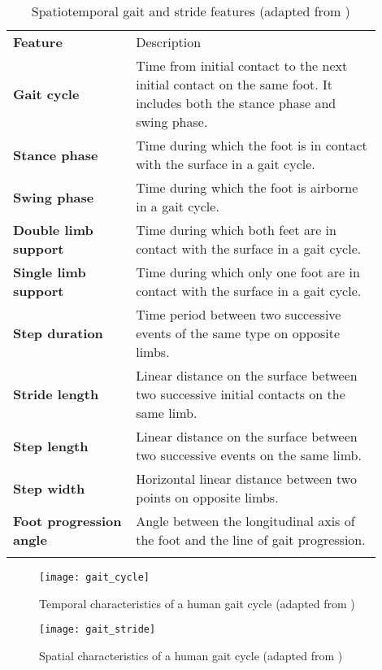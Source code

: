 		\begin{longtable}{@{}>{\raggedright\arraybackslash\bfseries}m{0.3\linewidth}>{\raggedright\arraybackslash}m{0.6\linewidth}@{}}
		\toprule
		Feature & Description \\* \midrule 
		\endhead
		Gait cycle & Time from initial contact to the next initial contact on the same foot. It includes both the stance phase and swing phase.  \\
		Stance phase & Time during which the foot is in contact with the surface in a gait cycle. \\
		Swing phase & Time during which the foot is airborne in a gait cycle. \\
		Double limb support & Time during which both feet are in contact with the surface in a gait cycle. \\
		Single limb support & Time during which only one foot are in contact with the surface in a gait cycle. \\
		Step duration & Time period between two successive events of the same type on opposite limbs. \\
		Stride length & Linear distance on the surface between two successive initial contacts on the same limb. \\
		Step length & Linear distance on the surface between two successive events on the same limb. \\
		Step width & Horizontal linear distance between two points on opposite limbs. \\
		Foot progression angle & Angle between the longitudinal axis of the foot and the line of gait progression. \\* \bottomrule
		\caption[Spatiotemporal gait and stride features]{Spatiotemporal gait and stride features (adapted from \cite{Biase2020})}
		\label{tab:gait_feat} 
	\end{longtable}

	\begin{figure}[ht]
		\centering
		\texttt{[image: gait\_cycle]}
		\caption[Temporal characteristics of a human gait cycle]{Temporal characteristics of a human gait cycle (adapted from \cite{Zanardi2021})}
		\label{fig:gait_drawing}
	\end{figure}

    \begin{figure}[ht]
    	\centering
    	\texttt{[image: gait\_stride]}
    	\caption[Spatial characteristics of a human gait cycle]{Spatial characteristics of a human gait cycle (adapted from \cite{Biase2020})}
    	\label{fig:gait_stride}
    \end{figure}

